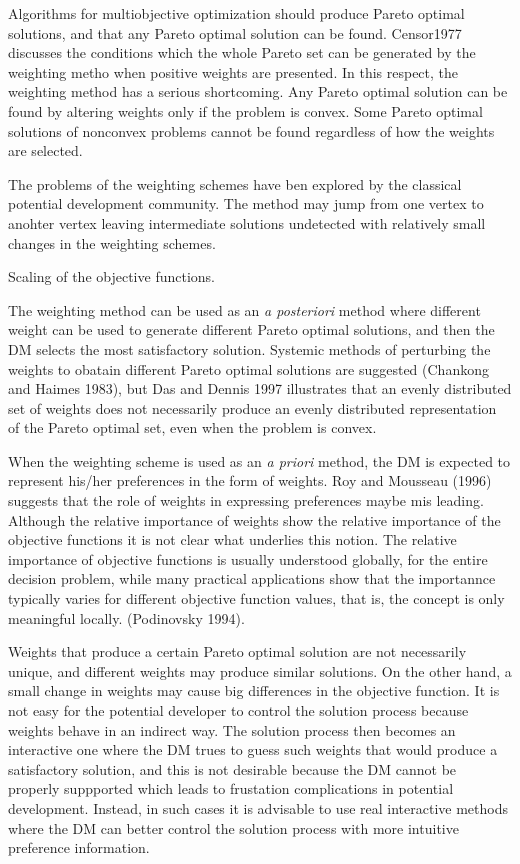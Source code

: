 Algorithms for multiobjective optimization should produce Pareto optimal solutions, and that any Pareto optimal solution can be found.  Censor1977 discusses the conditions which the whole Pareto set can be generated by the weighting metho when positive weights are presented.  In this respect, the weighting method has a serious shortcoming.  Any Pareto optimal solution can be found by altering weights only if the problem is convex.  Some Pareto optimal solutions of nonconvex problems cannot be found regardless of how the weights are selected.

The problems of the weighting schemes have ben explored by the classical potential development community.  The method may jump from one vertex to anohter vertex leaving intermediate solutions undetected with relatively small changes in the weighting schemes.

Scaling of the objective functions.

The weighting method can be used as an \emph{a posteriori} method where different weight can be used to generate different Pareto optimal solutions, and then the DM selects the most satisfactory solution.  Systemic methods of perturbing the weights to obatain different Pareto optimal solutions are suggested (Chankong and Haimes 1983), but Das and Dennis 1997 illustrates that an evenly distributed set of weights does not necessarily produce an evenly distributed representation of the Pareto optimal set, even when the problem is convex.

When the weighting scheme is used as an \emph{a priori} method, the DM is expected to represent his/her preferences in the form of weights.  Roy and Mousseau (1996) suggests that the role of weights in expressing preferences maybe mis leading.  Although the relative importance of weights show the relative importance of the objective functions it is not clear what underlies this notion.  The relative importance of objective functions is usually understood globally, for the entire decision problem, while many practical applications show that the importannce typically varies for different objective function values, that is, the concept is only meaningful locally. (Podinovsky 1994).

Weights that produce a certain Pareto optimal solution are not necessarily unique, and different weights may produce similar solutions.  On the other hand, a small change in weights may cause big differences in the objective function.  It is not easy for the potential developer to control the solution process because weights behave in an indirect way.  The solution process then becomes an interactive one where the DM trues to guess such weights that would produce a satisfactory solution, and this is not desirable because the DM cannot be properly suppported which leads to frustation complications in potential development.  Instead, in such cases it is advisable to use real interactive methods where the DM can better control the solution process with more intuitive preference information.

